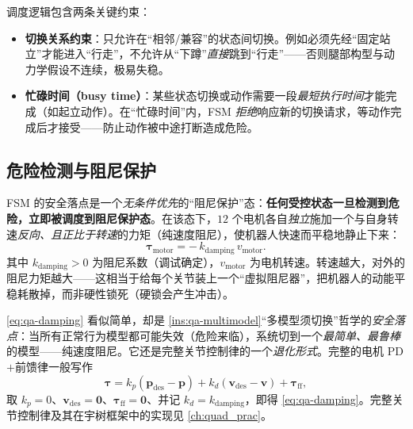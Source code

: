 调度逻辑包含两条关键约束\cite{yu2021quadruped}：
\begin{itemize}
  \item \textbf{切换关系约束}：只允许在“相邻/兼容”的状态间切换。例如必须先经“固定站立”才能进入“行走”，不允许从“下蹲”\emph{直接}跳到“行走”——否则腿部构型与动力学假设不连续，极易失稳。
  \item \textbf{忙碌时间（busy time）}：某些状态切换或动作需要一段\emph{最短执行时间}才能完成（如起立动作）。在“忙碌时间”内，FSM \emph{拒绝}响应新的切换请求，等动作完成后才接受——防止动作被中途打断造成危险。
\end{itemize}

\subsection{危险检测与阻尼保护}
\label{subsec:qa-fsm-safe}

FSM 的安全落点是一个\emph{无条件优先}的“阻尼保护”态：\textbf{任何受控状态一旦检测到危险，立即被调度到阻尼保护态}\cite{yu2021quadruped}。在该态下，$12$ 个电机各自\emph{独立}施加一个与自身转速\emph{反向、且正比于转速}的力矩（纯速度阻尼），使机器人快速而平稳地静止下来：
\begin{equation}
  \boldsymbol\tau_{\mathrm{motor}}=-\,k_{\mathrm{damping}}\,v_{\mathrm{motor}}.
  \label{eq:qa-damping}
\end{equation}
其中 $k_{\mathrm{damping}}>0$ 为阻尼系数（调试确定），$v_{\mathrm{motor}}$ 为电机转速。转速越大，对外的阻尼力矩越大——这相当于给每个关节装上一个“虚拟阻尼器”，把机器人的动能平稳耗散掉，而非硬性锁死（硬锁会产生冲击）\cite{yu2021quadruped}。

\begin{insight}\label{ins:qa-damping-degenerate}
\cref{eq:qa-damping} 看似简单，却是 \cref{ins:qa-multimodel}“多模型须切换”哲学的\emph{安全落点}：当所有正常行为模型都可能失效（危险来临），系统切到一个\emph{最简单、最鲁棒}的模型——纯速度阻尼。它还是完整关节控制律的一个\emph{退化形式}。完整的电机 PD$+$前馈律一般写作
\[
  \boldsymbol\tau=k_p(\boldsymbol p_{\mathrm{des}}-\boldsymbol p)+k_d(\boldsymbol v_{\mathrm{des}}-\boldsymbol v)+\boldsymbol\tau_{\mathrm{ff}},
\]
取 $k_p=0$、$\boldsymbol v_{\mathrm{des}}=\mathbf{0}$、$\boldsymbol\tau_{\mathrm{ff}}=\mathbf{0}$、并记 $k_d=k_{\mathrm{damping}}$，即得 \cref{eq:qa-damping}。完整关节控制律及其在宇树框架中的实现见 \cref{ch:quad_prac}。
\end{insight}

